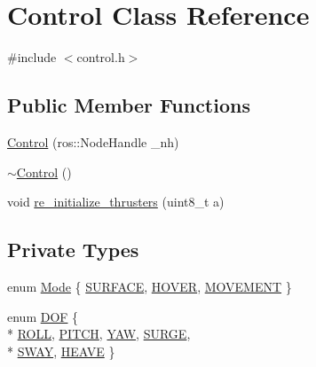 \hypertarget{classControl}{}\section{Control Class Reference}
\label{classControl}


{\ttfamily \#include $<$control.\+h$>$}

\subsection*{Public Member Functions}
\begin{DoxyCompactItemize}
\item 
\hyperlink{classControl_a7bb364fb0c2a6b5d016e2e54b7780bd5}{Control} (ros\+::\+Node\+Handle \+\_\+nh)
\item 
\hyperlink{classControl_aedda1328c4f8b8d49bca8f0812d3bfd1}{$\sim$\+Control} ()
\item 
void \hyperlink{classControl_a82daf30e8fde43c32806596fc7af54a0}{re\+\_\+initialize\+\_\+thrusters} (uint8\+\_\+t a)
\end{DoxyCompactItemize}
\subsection*{Private Types}
\begin{DoxyCompactItemize}
\item 
enum \hyperlink{classControl_aec427881835df23855ec0c97ac878b02}{Mode} \{ \hyperlink{classControl_aec427881835df23855ec0c97ac878b02af5203a07629b0cfbee4beb2ea8ef59ce}{S\+U\+R\+F\+A\+CE}, 
\hyperlink{classControl_aec427881835df23855ec0c97ac878b02afe6afa3b892905cb2e794e4910410672}{H\+O\+V\+ER}, 
\hyperlink{classControl_aec427881835df23855ec0c97ac878b02a90cb3b62282c5e4a7034dbcb0a9a7a56}{M\+O\+V\+E\+M\+E\+NT}
 \}
\item 
enum \hyperlink{classControl_a6cb75f414551e72f7836047be8ce6ef3}{D\+OF} \{ \\*
\hyperlink{classControl_a6cb75f414551e72f7836047be8ce6ef3a66d7da02816f41dfb470959992dda07b}{R\+O\+LL}, 
\hyperlink{classControl_a6cb75f414551e72f7836047be8ce6ef3a3f79f1ec1f3714c97f6406cdf02c9d5d}{P\+I\+T\+CH}, 
\hyperlink{classControl_a6cb75f414551e72f7836047be8ce6ef3a3a87adfa950e9cd62dd62384419d566a}{Y\+AW}, 
\hyperlink{classControl_a6cb75f414551e72f7836047be8ce6ef3a08820406112ab583ae04e42dcd894cae}{S\+U\+R\+GE}, 
\\*
\hyperlink{classControl_a6cb75f414551e72f7836047be8ce6ef3a715319302ea2e70c919a3c0786df3abe}{S\+W\+AY}, 
\hyperlink{classControl_a6cb75f414551e72f7836047be8ce6ef3a2c7e3389f74efe4ea7d499848eed9a42}{H\+E\+A\+VE}
 \}
\end{DoxyCompactItemize}
